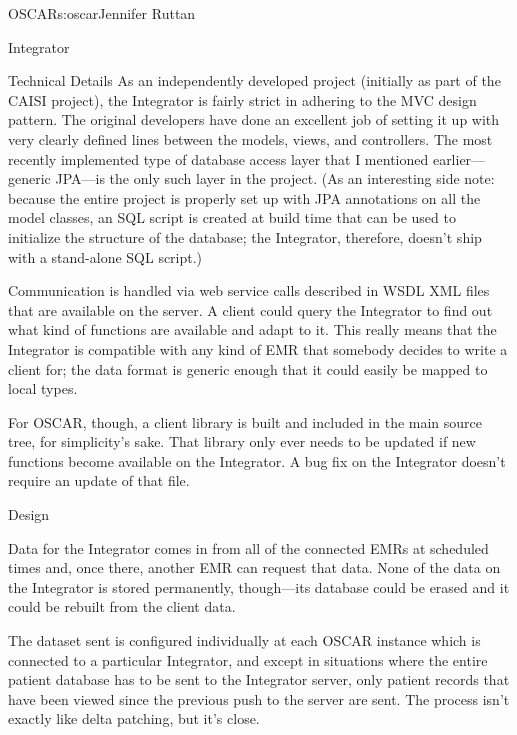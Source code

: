 \begin{aosachapter}{OSCAR}{s:oscar}{Jennifer Ruttan}
\begin{aosasect1}{Integrator}
\begin{aosasect2}{Technical Details}
As an independently developed project (initially as part of the CAISI
project), the Integrator is fairly strict in adhering to the
MVC design pattern. The original developers have done an excellent job
of setting it up with very clearly defined lines between the models,
views, and controllers. The most recently implemented type of database
access layer that I mentioned earlier---generic JPA---is the only such
layer in the project. (As an interesting side note: because the entire
project is properly set up with JPA annotations on all the model
classes, an SQL script is created at build time that can be used to
initialize the structure of the database; the Integrator, therefore,
doesn't ship with a stand-alone SQL script.)

Communication is handled via web service calls described in WSDL XML
files that are available on the server. A client could query the
Integrator to find out what kind of functions are available and adapt
to it. This really means that the Integrator is compatible with any
kind of EMR that somebody decides to write a client for; the data
format is generic enough that it could easily be mapped to local
types.

For OSCAR, though, a client library is built and included in the main
source tree, for simplicity's sake. That library only ever needs to be
updated if new functions become available on the Integrator. A bug fix
on the Integrator doesn't require an update of that file.

\end{aosasect2}

\begin{aosasect2}{Design}

Data for the Integrator comes in from all of the connected EMRs at
scheduled times and, once there, another EMR can request that data. None
of the data on the Integrator is stored permanently, though---its
database could be erased and it could be rebuilt from the client data.

The dataset sent is configured individually at each OSCAR instance
which is connected to a particular 
Integrator, and except in situations where the entire
patient database has to be sent to the Integrator server, only patient
records that have been viewed since the previous push to the server
are sent. The process isn't exactly like delta patching, but it's
close.



\end{aosasect2}
\end{aosasect1}
\end{aosachapter}
